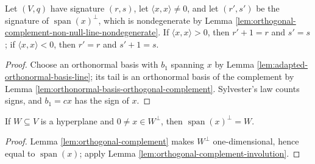 \begin{proposition}
\label{prop:hypersurface-signature-pointwise}





Let $(V,q)$ have signature $(r,s)$, let $\langle x,x\rangle\ne0$, and let $(r',s')$ be the signature of $\operatorname{span}(x)^\perp$, which is nondegenerate by Lemma \ref{lem:orthogonal-complement-non-null-line-nondegenerate}. If $\langle x,x\rangle>0$, then $r'+1=r$ and $s'=s$; if $\langle x,x\rangle<0$, then $r'=r$ and $s'+1=s$.
\end{proposition}
\begin{proof}

\sketch Choose an orthonormal basis with $b_1$ spanning $x$ by Lemma \ref{lem:adapted-orthonormal-basis-line}; its tail is an orthonormal basis of the complement by Lemma \ref{lem:orthonormal-basis-orthogonal-complement}. Sylvester's law counts signs, and $b_1=cx$ has the sign of $x$.
\end{proof}

\begin{lemma}
\label{lem:hyperplane-eq-complement-normal-line}





If $W\subseteq V$ is a hyperplane and $0\ne x\in W^\perp$, then $\operatorname{span}(x)^\perp=W$.
\end{lemma}
\begin{proof}

\sketch Lemma \ref{lem:orthogonal-complement} makes $W^\perp$ one-dimensional, hence equal to $\operatorname{span}(x)$; apply Lemma \ref{lem:orthogonal-complement-involution}.
\end{proof}

